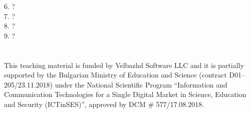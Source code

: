 \documentclass[a4paper,12pt]{minimal}
\begin{document}
\begin{Form}[action=mailto:todor.balabanov@gmail.com,encoding=text,method=post]
6. ?
\\%

7. ?
\\

8. ?
\\%

9. ?
\\

\\ \\

{\ssmall This teaching material is funded by Velbazhd Software LLC and it is partially supported by the Bulgarian Ministry of Education and Science (contract D01–205/23.11.2018) under the National Scientific Program ``Information and Communication Technologies for a Single Digital Market in Science, Education and Security (ICTinSES)'', approved by DCM \# 577/17.08.2018.}

\end{Form}
\end{document}
